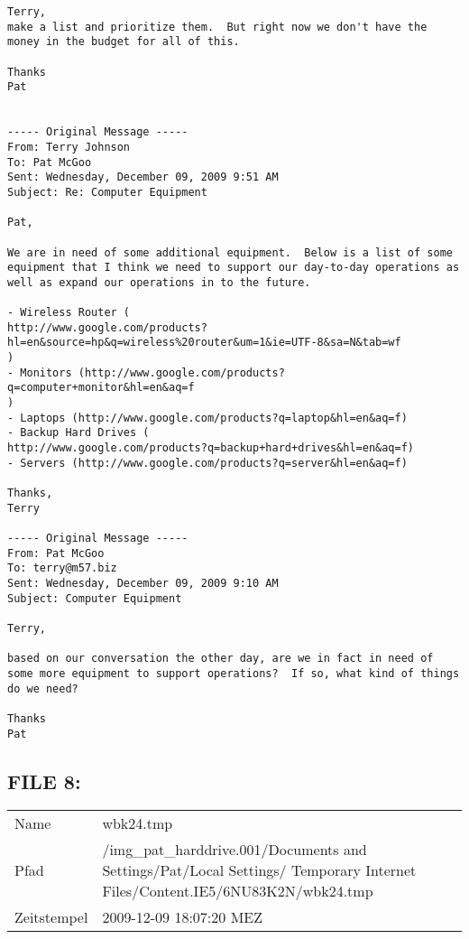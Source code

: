\begin{lstlisting}
Terry,
make a list and prioritize them.  But right now we don't have the 
money in the budget for all of this.

Thanks
Pat


----- Original Message -----
From: Terry Johnson
To: Pat McGoo
Sent: Wednesday, December 09, 2009 9:51 AM
Subject: Re: Computer Equipment

Pat,

We are in need of some additional equipment.  Below is a list of some
equipment that I think we need to support our day-to-day operations as
well as expand our operations in to the future.

- Wireless Router (
http://www.google.com/products?hl=en&source=hp&q=wireless%20router&um=1&ie=UTF-8&sa=N&tab=wf
)
- Monitors (http://www.google.com/products?q=computer+monitor&hl=en&aq=f
)
- Laptops (http://www.google.com/products?q=laptop&hl=en&aq=f)
- Backup Hard Drives (
http://www.google.com/products?q=backup+hard+drives&hl=en&aq=f)
- Servers (http://www.google.com/products?q=server&hl=en&aq=f)

Thanks,
Terry

----- Original Message -----
From: Pat McGoo
To: terry@m57.biz
Sent: Wednesday, December 09, 2009 9:10 AM
Subject: Computer Equipment

Terry,

based on our conversation the other day, are we in fact in need of
some more equipment to support operations?  If so, what kind of things
do we need? 

Thanks
Pat
\end{lstlisting}

\subsection{FILE 8:}	

\begin{table}[htb]
	\begin{tabular}{p{2cm} p{13.5cm}}
		Name & wbk24.tmp\\
		Pfad & /img_pat_harddrive.001/Documents and Settings/Pat/Local Settings/ Temporary Internet Files/Content.IE5/6NU83K2N/wbk24.tmp\\
		Zeitstempel & 2009-12-09 18:07:20 MEZ
	\end{tabular}
\end{table}	

